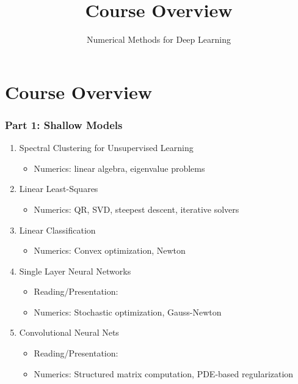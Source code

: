 \documentclass[12pt,fleqn]{beamer}
\title[Intro]{Course Overview}
\subtitle{Numerical Methods for Deep Learning}
\date{}
\begin{document}
\makebeamertitle
\section{Course Overview} 
\label{sec:course_overview}
\begin{frame}
\frametitle{Part 1: Shallow Models}
\begin{enumerate}
\item Spectral Clustering for Unsupervised Learning
\begin{itemize}
	\item Numerics: linear algebra, eigenvalue problems
\end{itemize}
\item Linear Least-Squares
\begin{itemize}
	\item Numerics: QR, SVD, steepest descent, iterative solvers
\end{itemize}
\item Linear Classification
\begin{itemize}
	\item Numerics: Convex optimization, Newton 
\end{itemize}
\item Single Layer Neural Networks
\begin{itemize}
	\item Reading/Presentation: \cite{HuangEtAl2006} 
	\item Numerics: Stochastic optimization, Gauss-Newton
\end{itemize}
\item Convolutional Neural Nets
\begin{itemize}
	\item Reading/Presentation: \cite{LeCun1990,GlorotBengio2010} 
	\item Numerics: Structured matrix computation, PDE-based regularization
\end{itemize}
\end{enumerate}
\end{frame}
\end{document}
